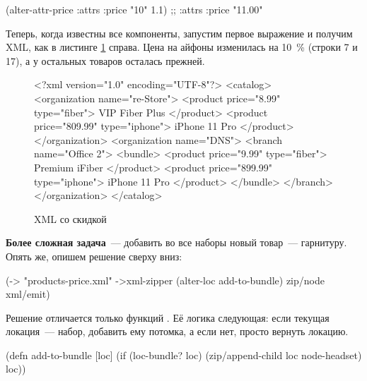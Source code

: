 \begin{english}
  \begin{clojure}
(alter-attr-price {:attrs {:price "10"}} 1.1)
;; {:attrs {:price "11.00"}}
  \end{clojure}
\end{english}

Теперь, когда известны все компоненты, запустим первое выражение и получим XML,
как в листинге \ref{fig:chart-xml-02} справа. Цена на айфоны изменилась на 10~\%
(строки 7 и 17), а у остальных товаров осталась прежней.

\begin{figure}[ht!]

\begin{english}
  \begin{xml/lines}
<?xml version="1.0" encoding="UTF-8"?>
<catalog>
  <organization name="re-Store">
    <product price="8.99" type="fiber">
      VIP Fiber Plus
    </product>
    <product price="809.99" type="iphone">
      iPhone 11 Pro
    </product>
  </organization>
  <organization name="DNS">
    <branch name="Office 2">
      <bundle>
        <product price="9.99" type="fiber">
          Premium iFiber
        </product>
        <product price="899.99" type="iphone">
          iPhone 11 Pro
        </product>
      </bundle>
    </branch>
  </organization>
</catalog>
  \end{xml/lines}
\end{english}

\captionsetup{labelformat=lis}
\caption{XML со скидкой}

\label{fig:chart-xml-02}

\end{figure}

\textbf{Более сложная задача}~--- добавить во все наборы новый товар~---
гарнитуру. Опять же, опишем решение сверху вниз:

\begin{english}
  \begin{clojure}
(-> "products-price.xml"
    ->xml-zipper
    (alter-loc add-to-bundle)
    zip/node
    xml/emit)
  \end{clojure}
\end{english}

Решение отличается только функций . Её логика следующая: если
текущая локация~--- набор, добавить ему потомка, а если нет, просто вернуть
локацию.

\begin{english}
  \begin{clojure}
(defn add-to-bundle [loc]
  (if (loc-bundle? loc)
    (zip/append-child loc node-headset)
    loc))
  \end{clojure}
\end{english}

